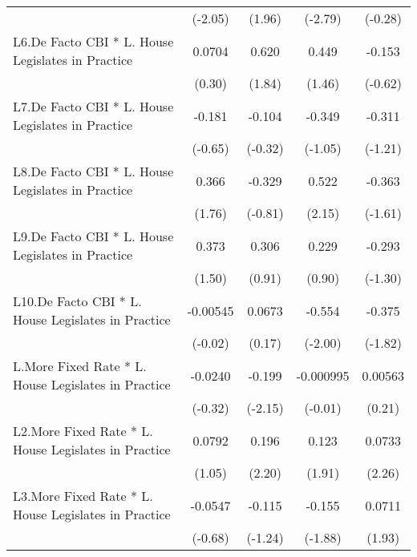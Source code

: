 {\begin{longtable}{l*{4}{c}}
                &  (-2.05)         &   (1.96)         &  (-2.79)         &  (-0.28)         \\
[1em]
L6.De Facto CBI * L. House Legislates in Practice&   0.0704         &    0.620         &    0.449         &   -0.153         \\
                &   (0.30)         &   (1.84)         &   (1.46)         &  (-0.62)         \\
[1em]
L7.De Facto CBI * L. House Legislates in Practice&   -0.181         &   -0.104         &   -0.349         &   -0.311         \\
                &  (-0.65)         &  (-0.32)         &  (-1.05)         &  (-1.21)         \\
[1em]
L8.De Facto CBI * L. House Legislates in Practice&    0.366         &   -0.329         &    0.522\sym{*}  &   -0.363         \\
                &   (1.76)         &  (-0.81)         &   (2.15)         &  (-1.61)         \\
[1em]
L9.De Facto CBI * L. House Legislates in Practice&    0.373         &    0.306         &    0.229         &   -0.293         \\
                &   (1.50)         &   (0.91)         &   (0.90)         &  (-1.30)         \\
[1em]
L10.De Facto CBI * L. House Legislates in Practice& -0.00545         &   0.0673         &   -0.554\sym{*}  &   -0.375         \\
                &  (-0.02)         &   (0.17)         &  (-2.00)         &  (-1.82)         \\
[1em]
L.More Fixed Rate * L. House Legislates in Practice&  -0.0240         &   -0.199\sym{*}  &-0.000995         &  0.00563         \\
                &  (-0.32)         &  (-2.15)         &  (-0.01)         &   (0.21)         \\
[1em]
L2.More Fixed Rate * L. House Legislates in Practice&   0.0792         &    0.196\sym{*}  &    0.123         &   0.0733\sym{*}  \\
                &   (1.05)         &   (2.20)         &   (1.91)         &   (2.26)         \\
[1em]
L3.More Fixed Rate * L. House Legislates in Practice&  -0.0547         &   -0.115         &   -0.155         &   0.0711         \\
                &  (-0.68)         &  (-1.24)         &  (-1.88)         &   (1.93)         \\

\end{longtable}}
